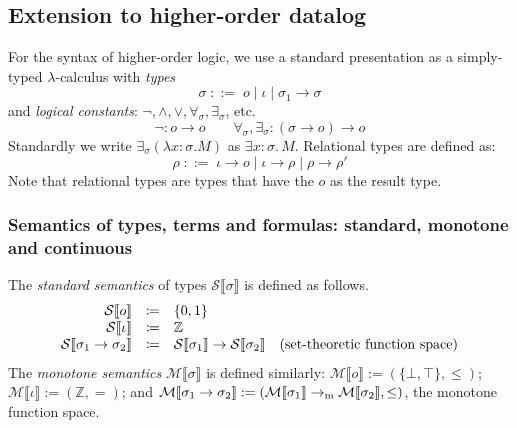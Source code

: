 
\newcommand{\abs}[2]{\lambda #1.{#2}}

\newcommand{\boolsort}{o}
\newcommand{\intsort}{\iota}
\newcommand{\mng}[1]{\llbracket #1 \rrbracket}
\newcommand{\mmng}[1]{\mathcal{M}\llbracket #1 \rrbracket}
\newcommand{\cmng}[1]{\mathcal{C}\llbracket #1 \rrbracket}
\newcommand{\smng}[1]{\mathcal{S}\llbracket #1 \rrbracket}
\newcommand\makeset[1]{\{#1\}}
\newcommand\disjointTimesS{\disjointTimes_S}
\newcommand\twistS{\twist_S}
\newcommand\superposeS{{\superpose_S}}

\subsection{Extension to higher-order datalog}

For the syntax of higher-order logic, we use a standard presentation as a simply-typed $\lambda$-calculus with \emph{types}
\[
\sigma \; ::= \; \boolsort \mid \intsort \mid \sigma_1 \to \sigma
\]
and \emph{logical constants}: $\neg, \wedge, \vee, \forall_\sigma, \exists_\sigma$, etc.
\[ \neg : \boolsort \to \boolsort \qquad \forall_\sigma, \exists_\sigma : (\sigma \to \boolsort) \to \boolsort\]
Standardly we write $\exists_\sigma(\abs{x\!\!:\!\!\sigma}{M})$ as $\exists x\!\!:\!\!\sigma .\, M$.
Relational types are defined as:
\[
\rho \; ::= \; \intsort \to \boolsort \mid \intsort \to \rho \mid \rho \to \rho'
\]
Note that relational types are types that have the $\boolsort$ as the result type.

\subsubsection{Semantics of types, terms and formulas: standard, monotone and continuous}
The \emph{standard semantics} of types $\smng{\sigma}$ is defined as follows.
\[
\begin{array}{rll}
  \smng{\boolsort} & \coloneqq  & \makeset{0, 1} \\ 
  \smng{\intsort} & \coloneqq  & \mathbb{Z} \\
  \smng{\sigma_1 \to \sigma_2} & \coloneqq  & \smng{\sigma_1} \to \smng{\sigma_2} \quad \hbox{(set-theoretic function space)}
\end{array}
\]
The \emph{monotone semantics} $\mmng{\sigma}$ is defined similarly: $\mmng{\boolsort} := (\makeset{\bot, \top}, \leq)$; $\mmng{\intsort} := (\mathbb{Z}, =)$; and $\mmng{\sigma_1 \to \sigma_2} := (\mmng{\sigma_1} \to_{\rm m} \mmng{\sigma_2}, \leq)$, the monotone function space.

